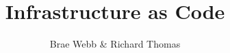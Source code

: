 \documentclass{csse4400}
\title{Infrastructure as Code}
\author{Brae Webb \& Richard Thomas}
\date{\week{4}}
\begin{document}
\makecover



% 
% 
\end{document}
